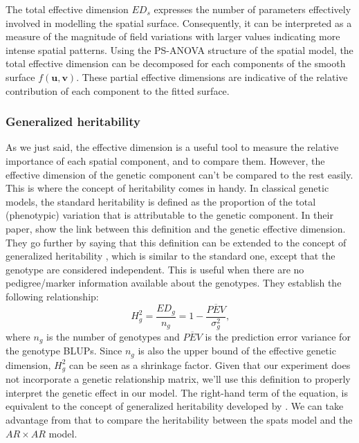 The total effective dimension $ED_{s}$ expresses the number of parameters effectively involved in modelling the spatial surface.
Consequently, it can be interpreted as a measure of the magnitude of field variations with larger values indicating more intense spatial patterns. 
Using the PS-ANOVA structure of the spatial model, the total effective dimension can be decomposed for each components of the smooth surface $f(\boldsymbol{u},\boldsymbol{v})$.  These partial effective dimensions are indicative of the relative contribution of each component to the fitted surface.

\subsubsection{Generalized heritability}
As we just said, the effective dimension is a useful tool to measure the relative importance of each spatial component, and to compare them. However, the effective dimension of the genetic component can't be compared to the rest easily. This is where the concept of heritability comes in handy. In classical genetic models, the standard heritability is defined as the proportion of the total (phenotypic) variation that is attributable to the genetic component. In their paper, \textcite{rodriguez-alvarez_correcting_2018} show the link between this definition and the genetic effective dimension. They go further by saying that this definition can be extended to the concept of generalized heritability \parencite{oakey_joint_2006}, which is similar to the standard one, except that the genotype are considered independent. This is useful when there are no pedigree/marker information available about the genotypes. They establish the following relationship:
\begin{equation}
H_{g}^2 = \dfrac{ED_{g}}{n_{g}} = 1 - \dfrac{\overline{PEV}}{\sigma^2_{g}}
\text{,}
\end{equation}
where $n_{g}$ is the number of genotypes and $\overline{PEV}$ is the prediction error variance for the genotype BLUPs. Since $n_{g}$ is also the upper bound of the effective genetic dimension, $H^2_{g}$ can be seen as a shrinkage factor. Given that our experiment does not incorporate a genetic relationship matrix, we'll use this definition to properly interpret the genetic effect in our model. The right-hand term of the equation, is equivalent to the concept of generalized heritability developed by \textcite{welham2010comparison}. We can take advantage from that to compare the heritability between the spats model and the $AR \times AR$ model.

